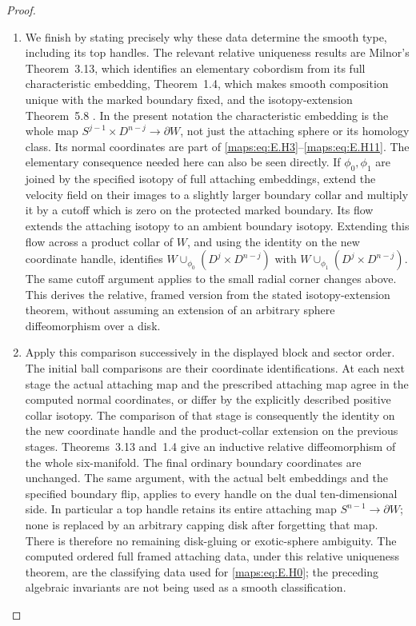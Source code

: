 \begin{proof}
\begin{enumerate}[label=\arabic*.,leftmargin=*]
\item We finish by stating precisely why these data determine the smooth
type, including its top handles.  The relevant relative uniqueness
results are Milnor's Theorem~3.13, which identifies an elementary
cobordism from its full characteristic embedding, Theorem~1.4,
which makes smooth composition unique with the marked boundary
fixed, and the isotopy-extension Theorem~5.8
\cite{mapsMilnor65}.  In the present notation the characteristic
embedding is the whole map
$S^{j-1}\times D^{n-j}\longrightarrow\partial W$, not just
the attaching sphere or its homology class.  Its normal coordinates
are part of \eqref{maps:eq:E.H3}--\eqref{maps:eq:E.H11}.  The elementary consequence needed
here can also be seen directly.  If $\phi_0,\phi_1$ are joined
by the specified isotopy of full attaching embeddings, extend
the velocity field on their images to a slightly larger boundary
collar and multiply it by a cutoff which is zero on the protected
marked boundary.  Its flow extends the attaching isotopy to an
ambient boundary isotopy.  Extending this flow across a product
collar of $W$, and using the identity on the new coordinate handle,
identifies $W\cup_{\phi_0}(D^j\times D^{n-j})$ with
$W\cup_{\phi_1}(D^j\times D^{n-j})$.  The same cutoff argument
applies to the small radial corner changes above.  This derives
the relative, framed version from the stated isotopy-extension
theorem, without assuming an extension of an arbitrary sphere
diffeomorphism over a disk.

\item Apply this comparison successively in the displayed block and
sector order.  The initial ball comparisons are their coordinate
identifications.  At each next stage the actual attaching map
and the prescribed attaching map agree in the computed normal
coordinates, or differ by the explicitly described positive
collar isotopy.  The comparison of that stage is consequently
the identity on the new coordinate handle and the product-collar
extension on the previous stages.  Theorems~3.13 and~1.4 give an
inductive relative diffeomorphism of the whole six-manifold.
The final ordinary boundary coordinates are unchanged.  The
same argument, with the actual belt embeddings and the specified
boundary flip, applies to every handle on the dual ten-dimensional
side.  In particular a top handle retains its entire attaching
map $S^{n-1}\to\partial W$; none is replaced by an arbitrary
capping disk after forgetting that map.  There is therefore no
remaining disk-gluing or exotic-sphere ambiguity.  The computed
ordered full framed attaching data, under this relative uniqueness
theorem, are the classifying data used for \eqref{maps:eq:E.H0}; the preceding
algebraic invariants are not being used as a smooth classification.
\end{enumerate}
\end{proof}




